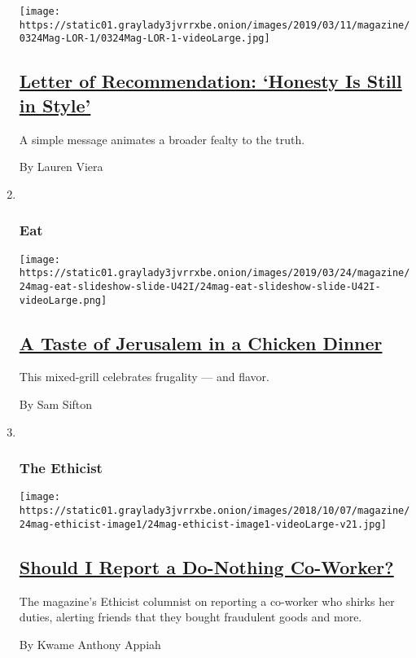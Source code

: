 \begin{enumerate}
  \texttt{[image: https://static01.graylady3jvrrxbe.onion/images/2019/03/11/magazine/0324Mag-LOR-1/0324Mag-LOR-1-videoLarge.jpg]}

  \hypertarget{letter-of-recommendation-honesty-is-still-in-style}{%
  \subsection{\texorpdfstring{\href{/2019/03/19/magazine/letter-of-recommendation-honesty-is-still-in-style.html}{Letter
  of Recommendation: `Honesty Is Still in
  Style'}}{Letter of Recommendation: `Honesty Is Still in Style'}}\label{letter-of-recommendation-honesty-is-still-in-style}}

  A simple message animates a broader fealty to the truth.

  By Lauren Viera
\item ~
  \hypertarget{eat}{%
  \subsubsection{Eat}\label{eat}}

  \texttt{[image: https://static01.graylady3jvrrxbe.onion/images/2019/03/24/magazine/24mag-eat-slideshow-slide-U42I/24mag-eat-slideshow-slide-U42I-videoLarge.png]}

  \hypertarget{a-taste-of-jerusalem-in-a-chicken-dinner}{%
  \subsection{\texorpdfstring{\href{/2019/03/20/magazine/jerusalem-grill-chicken-recipe.html}{A
  Taste of Jerusalem in a Chicken
  Dinner}}{A Taste of Jerusalem in a Chicken Dinner}}\label{a-taste-of-jerusalem-in-a-chicken-dinner}}

  This mixed-grill celebrates frugality --- and flavor.

  By Sam Sifton
\item ~
  \hypertarget{the-ethicist}{%
  \subsubsection{The Ethicist}\label{the-ethicist}}

  \texttt{[image: https://static01.graylady3jvrrxbe.onion/images/2018/10/07/magazine/24mag-ethicist-image1/24mag-ethicist-image1-videoLarge-v21.jpg]}

  \hypertarget{should-i-report-a-do-nothing-co-worker}{%
  \subsection{\texorpdfstring{\href{/2019/03/19/magazine/should-i-report-a-do-nothing-co-worker.html}{Should
  I Report a Do-Nothing
  Co-Worker?}}{Should I Report a Do-Nothing Co-Worker?}}\label{should-i-report-a-do-nothing-co-worker}}

  The magazine's Ethicist columnist on reporting a co-worker who shirks
  her duties, alerting friends that they bought fraudulent goods and
  more.

  By Kwame Anthony Appiah
\end{enumerate}

